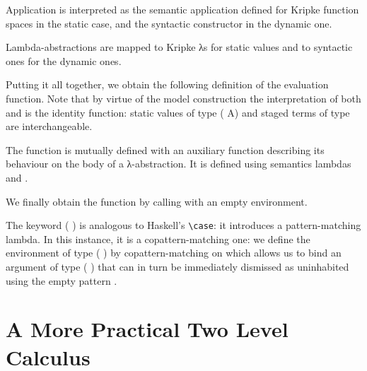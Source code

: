 Application is interpreted as the semantic application defined
for Kripke function spaces in the static case, and the syntactic
 constructor in the dynamic one.


Lambda-abstractions are mapped to Kripke λs for static values
and to syntactic ones for the dynamic ones.


Putting it all together, we obtain the following definition
of the evaluation function.
Note that by virtue of the model construction the interpretation
of both  and  is the identity function:
static values of type ( A) and staged terms of type 
are interchangeable.

\begin{AgdaSuppressSpace}
\end{AgdaSuppressSpace}

The function  is mutually defined with an auxiliary
function describing its behaviour on the body of a λ-abstraction.
It is defined using semantics lambdas and .

\begin{AgdaSuppressSpace}
\end{AgdaSuppressSpace}

We finally obtain the  function by calling  with an
empty environment.

\begin{AgdaSuppressSpace}
\end{AgdaSuppressSpace}

\begin{remark}
The keyword ( ) is analogous to Haskell's
\texttt{\textbackslash{}case}: it introduces a pattern-matching lambda.
In this instance, it is a copattern-matching one: we define
the environment of type (  ) by
copattern-matching on {} which allows us to bind
an argument of type (  ) that can in turn
be immediately dismissed as uninhabited using the empty pattern \AS{()}.
\end{remark}

\section{A More Practical Two Level Calculus}

